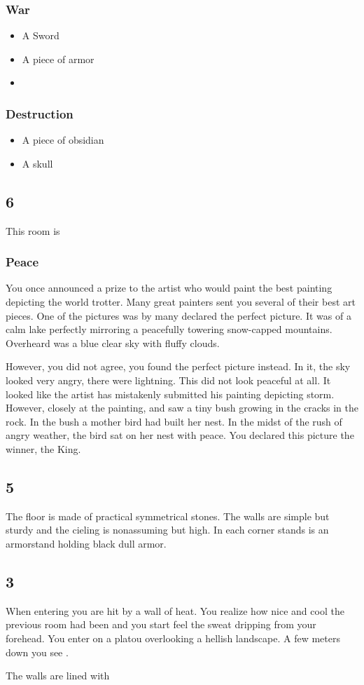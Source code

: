 \subsubsection*{War}
\begin{itemize}
    \item A Sword
    \item A piece of armor
    \item 
\end{itemize}
\subsubsection*{Destruction}
\begin{itemize}
    \item A piece of obsidian
    \item A skull
\end{itemize}

\subsection*{6}
This room is 

\subsubsection*{Peace}
You once announced a prize to the artist who would paint the best painting depicting the world trotter. Many great painters sent you several of their best art pieces. One of the pictures was by many declared the perfect picture. It was of a calm lake perfectly mirroring a peacefully towering snow-capped mountains. Overheard was a blue clear sky with fluffy clouds.

However, you did not agree, you found the perfect picture instead. In it, the sky looked very angry, there were lightning. This did not look peaceful at all. It looked like the artist has mistakenly submitted his painting depicting storm. However,  closely at the painting, and saw a tiny bush growing in the cracks in the rock. In the bush a mother bird had built her nest. In the midst of the rush of angry weather, the bird sat on her nest with peace. You declared this picture the winner, the King.

\subsection*{5}
The floor is made of practical symmetrical stones. The walls are simple but sturdy and the cieling is nonassuming but high. In each corner stands is an armorstand holding black dull armor.

\subsection*{3}
When entering you are hit by a wall of heat. You realize how nice and cool the previous room had been and you start feel the sweat dripping from your forehead. You enter on a platou overlooking a hellish landscape. A few meters down you see .

The walls are lined with 